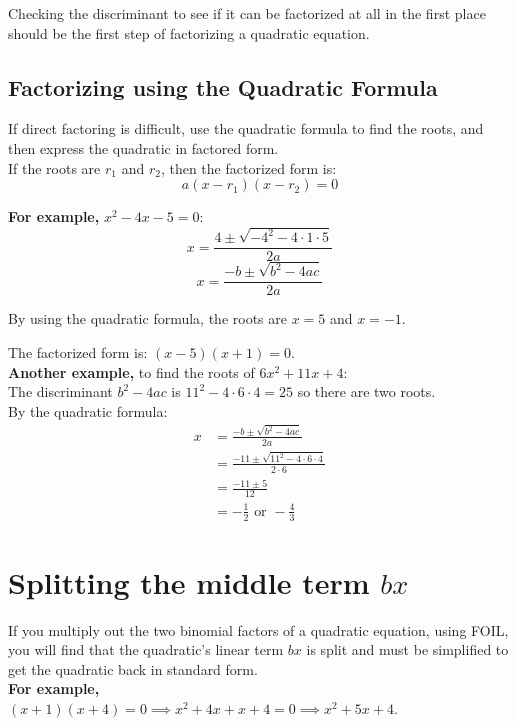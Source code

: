 \documentclass[12pt]{article}
\begin{document}
Checking the discriminant to see if it can be factorized at all in the first place should be the first step of factorizing a quadratic equation.

\subsection*{Factorizing using the Quadratic Formula}
If direct factoring is difficult, use the quadratic formula to find the roots, and then express the quadratic in factored form.\\

If the roots are $r_1$ and $r_2$, then the factorized form is:
$$a(x - r_1) (x - r_2)=0$$

\textbf{For example,} $x^2 - 4x - 5 = 0$:
$$x = \frac{4\pm\sqrt{-4^2 - 4\cdot1\cdot5}}{2a}$$
$$x = \frac{-b\pm\sqrt{b^2 - 4ac}}{2a}$$

By using the quadratic formula, the roots are $x=5$ and $x= - 1$.
    
The factorized form is: $(x - 5)(x + 1) = 0$.\\

\textbf{Another example,} to find the roots of $6x^2+11x+4$:\\

The discriminant $b^2 - 4ac$ is $11^2-4\cdot6\cdot4 = 25$ so there are two roots.\\

By the quadratic formula:
\begin{align*}
x &= \frac{-b\pm\sqrt{b^2 - 4ac}}{2a}\\
  &= \frac{-11\pm\sqrt{11^2 - 4\cdot6\cdot4}}{2\cdot6}\\
  &= \frac{-11 \pm 5}{12}\\
  &=-\frac{1}{2} \textrm{ or } -\frac{4}{3}
\end{align*}

\section*{Splitting the middle term $bx$}

If you multiply out the two binomial factors of a quadratic equation, using FOIL, you will find that the quadratic's linear term $bx$ is split and must be simplified to get the quadratic back in standard form.\\

\noindent
\textbf{For example,}\\$(x+1)(x+4) = 0 \implies x^2+4x+x+4 = 0 \implies x^2+5x+4$.\\
\end{document}

